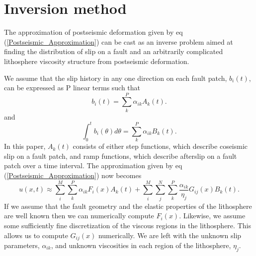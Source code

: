 \documentclass[12pt]{article}
\begin{document}
\section{Inversion method}
The approximation of postseismic deformation given by eq
(\ref{Postseismic_Approximation}) can be cast as an inverse problem
aimed at finding the distribution of slip on a fault and an
arbitrarily complicated lithosphere viscosity structure from
postseismic deformation.
  
We assume that the slip history in any one direction on each
fault patch, $b_i(t)$, can be expressed as P linear terms such that
\begin{equation}
  b_i(t) = \sum_k^P \alpha_{ik}A_k(t) .
\end{equation}
and
\begin{equation}
  \int_0^t b_i(\theta)d\theta = \sum_k^P\alpha_{ik}B_k(t) .
\end{equation}
In this paper, $A_k(t)$ consists of either step functions, which
describe coseismic slip on a fault patch, and ramp functions, which
describe afterslip on a fault patch over a time interval.  The
approximation given by eq (\ref{Postseismic_Approximation}) now
becomes
\begin{equation}\label{Postseismic_Approximation2}
u(x,t) \approx \sum_i^M\sum_k^P\alpha_{ik}F_i(x)A_k(t) + 
               \sum_i^M\sum_j^N\sum_k^P\frac{\alpha_{ik}}{\eta_j}G_{ij}(x)B_k(t).
\end{equation}
If we assume that the fault geometry and the elastic properties of the
lithosphere are well known then we can numerically compute
$F_i(x)$. Likewise, we assume some sufficiently fine discretization of
the viscous regions in the lithosphere. This allows us to compute
$G_{ij}(x)$ numerically.  We are left with the unknown slip
parameters, $\alpha_{ik}$, and unknown viscosities in each region of
the lithosphere, $\eta_j$.
\end{document}
